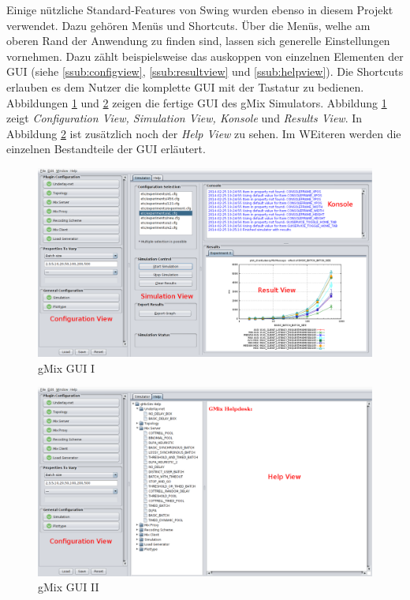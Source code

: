 \documentclass[a4paper, 11pt]{article} %
\begin{document}
Einige nützliche Standard-Features von Swing wurden ebenso in diesem Projekt verwendet. Dazu gehören Menüs und Shortcuts. Über die Menüs, welhe am oberen Rand der Anwendung zu finden sind, lassen sich generelle Einstellungen vornehmen. Dazu zählt beispielsweise das auskoppen von einzelnen Elementen der GUI (siehe \ref{ssub:configview}, \ref{ssub:resultview} und \ref{ssub:helpview}). Die Shortcuts erlauben es dem Nutzer die komplette GUI mit der Tastatur zu bedienen. \\
Abbildungen \ref{fig:gui1} und \ref{fig:gui2} zeigen die fertige GUI des gMix Simulators. Abbildung \ref{fig:gui1} zeigt \emph{Configuration View, Simulation View, Konsole} und \emph{Results View}. In Abbildung \ref{fig:gui2} ist zusätzlich noch der \emph{Help View} zu sehen. Im WEiteren werden die einzelnen Bestandteile der GUI erläutert.

\begin{figure}[!htp]
\includegraphics[width=\textwidth]{img/gmixGuiSimulator}
\caption{gMix GUI I}
\label{fig:gui1}
\end{figure}

\begin{figure}[!htp]
\includegraphics[width=\textwidth]{img/gMixGuiHelp}
\caption{gMix GUI II}
\label{fig:gui2}
\end{figure}
\end{document}
